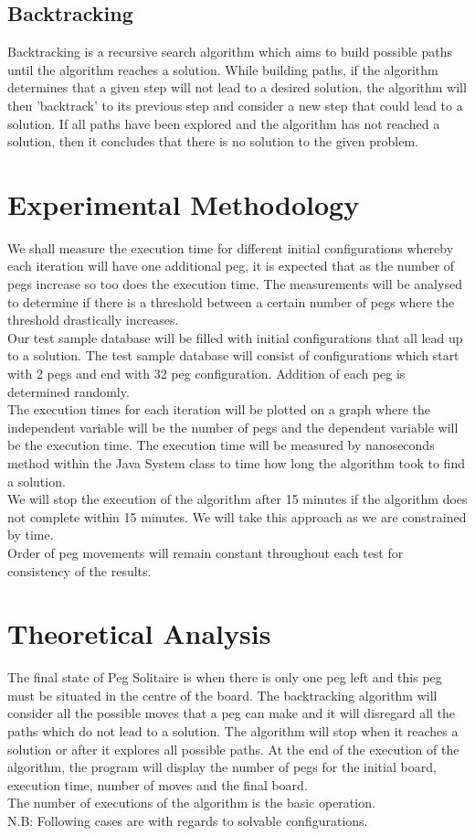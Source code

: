 \documentclass{article}
\begin{document}
\subsection{Backtracking}
Backtracking is a recursive search algorithm which aims to build possible paths until the algorithm reaches a solution. While building paths, if the algorithm determines that a given step will not lead to a desired solution, the algorithm will then 'backtrack' to its previous step and consider a new step that could lead to a solution. If all paths have been explored and the algorithm has not reached a solution, then it concludes that there is no solution to the given problem. 


\section{Experimental Methodology}
We shall measure the execution time for different initial configurations whereby each iteration will have one additional peg, it is expected that as the number of pegs increase so too does the execution time. The measurements will be analysed to determine if there is a threshold between a certain number of pegs where the threshold drastically increases.
\\Our test sample database will be filled with initial configurations that all lead up to a solution. The test sample database will consist of configurations which start with 2 pegs and end with 32 peg configuration. Addition of each peg is determined randomly.
\\The execution times for each iteration will be plotted on a graph where the independent variable will be the number of pegs and the dependent variable will be the execution time. The execution time will be measured by  nanoseconds method within the Java System class to time how long the algorithm took to find a solution.
\\We will stop the execution of the algorithm after 15 minutes if the algorithm does not complete within 15 minutes. We will take this approach as we are constrained by time.
\\Order of peg movements will remain constant throughout each test for consistency of the results.

\section{Theoretical Analysis}
The final state of Peg Solitaire is when there is only one peg left and this peg must be situated in the centre of the board. The backtracking algorithm will consider all the possible moves that a peg can make and it will disregard all the paths which do not lead to a solution. The algorithm will stop when it reaches a solution or after it explores all possible paths. At the end of the execution of the algorithm, the program will display the number of pegs for the initial board, execution time, number of moves and the final board.
\\The number of executions of the algorithm is the basic operation.
\\N.B: Following cases are with regards to solvable configurations. 
\end{document}
